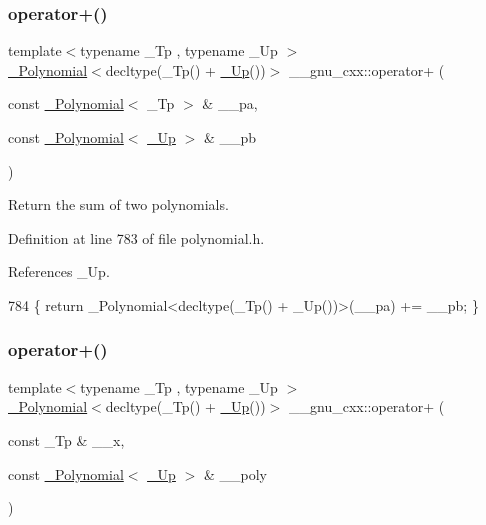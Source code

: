 \subsubsection{\texorpdfstring{operator+()}{operator+()}\hspace{0.1cm}{\footnotesize\ttfamily [2/3]}}
{\footnotesize\ttfamily template$<$typename \+\_\+\+Tp , typename \+\_\+\+Up $>$ \\
\hyperlink{class____gnu__cxx_1_1__Polynomial}{\+\_\+\+Polynomial}$<$decltype(\+\_\+\+Tp() + \hyperlink{namespace____gnu__cxx_ab693ea357b6429b331e0bf09f9442385}{\+\_\+\+Up}())$>$ \+\_\+\+\_\+gnu\+\_\+cxx\+::operator+ (\begin{DoxyParamCaption}\item[{const \hyperlink{class____gnu__cxx_1_1__Polynomial}{\+\_\+\+Polynomial}$<$ \+\_\+\+Tp $>$ \&}]{\+\_\+\+\_\+pa,  }\item[{const \hyperlink{class____gnu__cxx_1_1__Polynomial}{\+\_\+\+Polynomial}$<$ \hyperlink{namespace____gnu__cxx_ab693ea357b6429b331e0bf09f9442385}{\+\_\+\+Up} $>$ \&}]{\+\_\+\+\_\+pb }\end{DoxyParamCaption})\hspace{0.3cm}{\ttfamily [inline]}}

Return the sum of two polynomials. 

Definition at line 783 of file polynomial.\+h.



References \+\_\+\+Up.


\begin{DoxyCode}
784     \{ \textcolor{keywordflow}{return} \_Polynomial<decltype(\_Tp() + \_Up())>(\_\_pa) += \_\_pb; \}
\end{DoxyCode}
\mbox{\label{namespace____gnu__cxx_ac9f58ced995b65628b5715c885569cb7}} 
\subsubsection{\texorpdfstring{operator+()}{operator+()}\hspace{0.1cm}{\footnotesize\ttfamily [3/3]}}
{\footnotesize\ttfamily template$<$typename \+\_\+\+Tp , typename \+\_\+\+Up $>$ \\
\hyperlink{class____gnu__cxx_1_1__Polynomial}{\+\_\+\+Polynomial}$<$decltype(\+\_\+\+Tp() + \hyperlink{namespace____gnu__cxx_ab693ea357b6429b331e0bf09f9442385}{\+\_\+\+Up}())$>$ \+\_\+\+\_\+gnu\+\_\+cxx\+::operator+ (\begin{DoxyParamCaption}\item[{const \+\_\+\+Tp \&}]{\+\_\+\+\_\+x,  }\item[{const \hyperlink{class____gnu__cxx_1_1__Polynomial}{\+\_\+\+Polynomial}$<$ \hyperlink{namespace____gnu__cxx_ab693ea357b6429b331e0bf09f9442385}{\+\_\+\+Up} $>$ \&}]{\+\_\+\+\_\+poly }\end{DoxyParamCaption})\hspace{0.3cm}{\ttfamily [inline]}}



